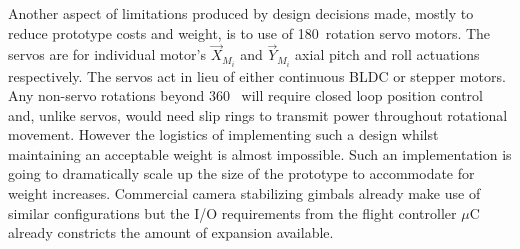\par
Another aspect of limitations produced by design decisions made, mostly to reduce prototype costs and weight, is to use of 180\textdegree ~rotation servo motors. The servos are for individual motor's $\vec{X}_{M_i}$ and $\vec{Y}_{M_i}$ axial pitch and  roll actuations respectively. The servos act in lieu of either continuous BLDC or stepper motors. Any non-servo rotations beyond 360\textdegree~ will require closed loop position control and, unlike servos, would need slip rings to transmit power throughout rotational movement. However the logistics of implementing such a design whilst maintaining an acceptable weight is almost impossible. Such an implementation is going to dramatically scale up the size of the prototype to accommodate for weight increases. Commercial camera stabilizing gimbals already make use of similar configurations but the I/O requirements from the flight controller $\mu$C already constricts the amount of expansion available.
\par
